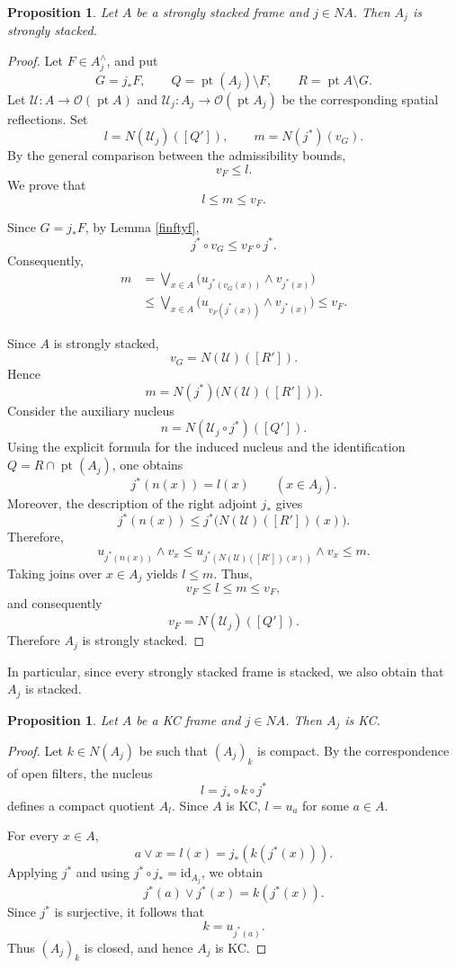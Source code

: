 \documentclass[11pt]{amsart}
\DeclareMathOperator{\pt}{pt}
\theoremstyle{plain}
\newtheorem{prop}[thm]{Proposition}
\theoremstyle{definition}
\begin{document}
\begin{prop}\label{Cocientefapilado}
Let $A$ be a strongly stacked frame and
$j\in NA$. Then $A_j$ is strongly stacked.
\end{prop}

\begin{proof}
Let $F\in A_j^\wedge$, and put
\[
G=j_*F,\qquad
Q=\pt(A_j)\setminus F,\qquad
R=\pt A\setminus G.
\]
Let $\mathcal U\colon A\to\mathcal O(\pt A)$ and
$\mathcal U_j\colon A_j\to\mathcal O(\pt A_j)$
be the corresponding spatial reflections.
Set
\[
l=N(\mathcal U_j)([Q']),
\qquad
m=N(j^*)(v_G).
\]
By the general comparison between the
admissibility bounds,
\[
v_F\leq l.
\]
We prove that
\[
l\leq m\leq v_F.
\]

Since $G=j_*F$, by Lemma \ref{finftyf},
\[
j^*\circ v_G\leq v_F\circ j^*.
\]
Consequently,
\[
\begin{aligned}
m
&=\bigvee_{x\in A}
\bigl(u_{j^*(v_G(x))}\wedge v_{j^*(x)}\bigr)\\
&\leq
\bigvee_{x\in A}
\bigl(u_{v_F(j^*(x))}\wedge v_{j^*(x)}\bigr)
\leq v_F.
\end{aligned}
\]

Since $A$ is strongly stacked,
\[
v_G=N(\mathcal U)([R']).
\]
Hence
\[
m=N(j^*)\bigl(N(\mathcal U)([R'])\bigr).
\]
Consider the auxiliary nucleus
\[
n=N(\mathcal U_j\circ j^*)([Q']).
\]
Using the explicit formula for the induced
nucleus and the identification
$Q=R\cap\pt(A_j)$, one obtains
\[
j^*(n(x))=l(x)
\qquad(x\in A_j).
\]
Moreover, the description of the right
adjoint $j_*$ gives
\[
j^*(n(x))
\leq
j^*\bigl(N(\mathcal U)([R'])(x)\bigr).
\]
Therefore,
\[
u_{j^*(n(x))}\wedge v_x
\leq
u_{j^*(N(\mathcal U)([R'])(x))}\wedge v_x
\leq m.
\]
Taking joins over $x\in A_j$ yields
$l\leq m$. Thus,
\[
v_F\leq l\leq m\leq v_F,
\]
and consequently
\[
v_F=N(\mathcal U_j)([Q']).
\]
Therefore $A_j$ is strongly stacked.
\end{proof}

In particular, since every strongly stacked frame is stacked, we also
obtain that \(A_j\) is stacked.

\begin{prop}\label{KCquout}
Let $A$ be a KC frame and $j\in NA$.
Then $A_j$ is KC.
\end{prop}

\begin{proof}
Let $k\in N(A_j)$ be such that $(A_j)_k$
is compact. By the correspondence of
open filters, the nucleus
\[
l=j_*\circ k\circ j^*
\]
defines a compact quotient $A_l$.
Since $A$ is KC, $l=u_a$ for some $a\in A$.

For every $x\in A$,
\[
a\vee x=l(x)=j_*(k(j^*(x))).
\]
Applying $j^*$ and using
$j^*\circ j_*=\mathrm{id}_{A_j}$,
we obtain
\[
j^*(a)\vee j^*(x)=k(j^*(x)).
\]
Since $j^*$ is surjective, it follows that
\[
k=u_{j^*(a)}.
\]
Thus $(A_j)_k$ is closed, and hence
$A_j$ is KC.
\end{proof}
\end{document}

